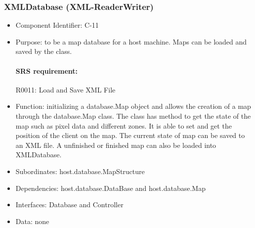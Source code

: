 \documentclass[11pt, a4paper]{report}
\begin{document}
\subsubsection{XMLDatabase (XML-ReaderWriter)}
\begin{itemize}
\item Component Identifier: C-11
\item Purpose: to be a map database for a host machine. Maps can be loaded and saved by the
class.
\paragraph{SRS requirement:} R0011: Load and Save XML File
\item Function: initializing a  database.Map object and allows the creation of a map through
the database.Map class. The class has method to get the state of the map such as pixel data and
different zones. It is able to set and get the position of the client on the map. The current state
of map can be saved to an XML file. A unfinished or finished map can also be loaded into XMLDatabase.
\item Subordinates: host.database.MapStructure
\item Dependencies: host.database.DataBase and host.database.Map
\item Interfaces: Database and Controller
\item Data: none
\end{itemize}

\end{document}
